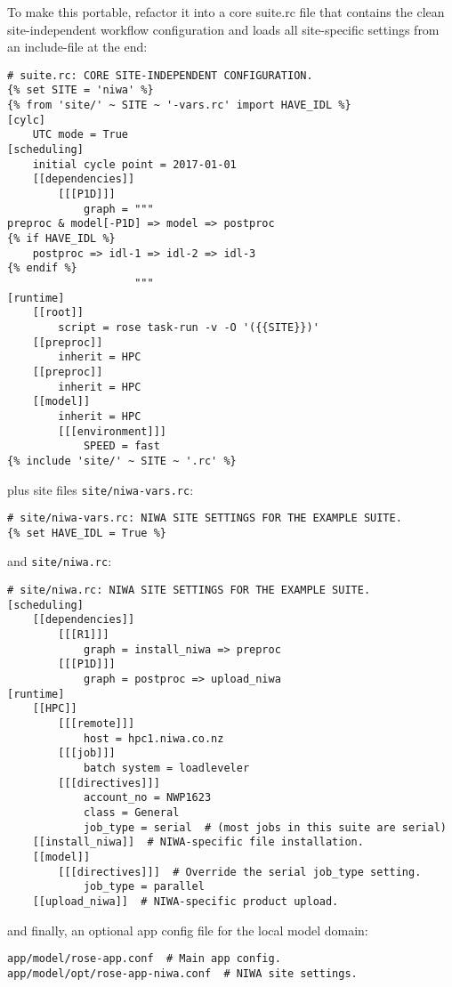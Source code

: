 To make this portable, refactor it into a core suite.rc file that contains the
clean site-independent workflow configuration and loads all site-specific
settings from an include-file at the end:

\lstset{language=suiterc}
\begin{lstlisting}
# suite.rc: CORE SITE-INDEPENDENT CONFIGURATION.
{% set SITE = 'niwa' %}
{% from 'site/' ~ SITE ~ '-vars.rc' import HAVE_IDL %}
[cylc]
    UTC mode = True
[scheduling]
    initial cycle point = 2017-01-01
    [[dependencies]]
        [[[P1D]]]
            graph = """
preproc & model[-P1D] => model => postproc
{% if HAVE_IDL %}
    postproc => idl-1 => idl-2 => idl-3
{% endif %}
                    """
[runtime]
    [[root]]
        script = rose task-run -v -O '({{SITE}})'
    [[preproc]]
        inherit = HPC
    [[preproc]]
        inherit = HPC
    [[model]]
        inherit = HPC
        [[[environment]]]
            SPEED = fast
{% include 'site/' ~ SITE ~ '.rc' %}
\end{lstlisting}

plus site files \lstinline=site/niwa-vars.rc=:

\lstset{language=suiterc}
\begin{lstlisting}
# site/niwa-vars.rc: NIWA SITE SETTINGS FOR THE EXAMPLE SUITE.
{% set HAVE_IDL = True %}
\end{lstlisting}

and \lstinline=site/niwa.rc=:

\lstset{language=suiterc}
\begin{lstlisting}
# site/niwa.rc: NIWA SITE SETTINGS FOR THE EXAMPLE SUITE.
[scheduling]
    [[dependencies]]
        [[[R1]]]
            graph = install_niwa => preproc
        [[[P1D]]]
            graph = postproc => upload_niwa
[runtime]
    [[HPC]]
        [[[remote]]]
            host = hpc1.niwa.co.nz
        [[[job]]]
            batch system = loadleveler
        [[[directives]]]
            account_no = NWP1623
            class = General
            job_type = serial  # (most jobs in this suite are serial)
    [[install_niwa]]  # NIWA-specific file installation.
    [[model]]
        [[[directives]]]  # Override the serial job_type setting.
            job_type = parallel
    [[upload_niwa]]  # NIWA-specific product upload.
\end{lstlisting}

and finally, an optional app config file for the local model domain:

\lstset{language=bash}
\begin{lstlisting}
app/model/rose-app.conf  # Main app config.
app/model/opt/rose-app-niwa.conf  # NIWA site settings.
\end{lstlisting}

